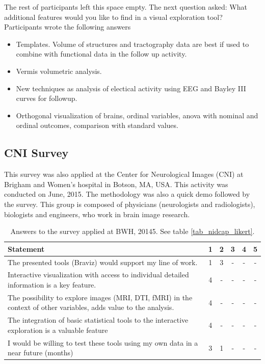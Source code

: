 The rest of participants left this space empty. The next question asked: What additional features would you like to find in a visual exploration tool? Participants wrote the following answers
\begin{itemize}
	\item Templates. Volume of structures and tractography data are best if used to combine with functional data in the follow up activity. 
	\item Vermis volumetric analysis.
	\item New techniques as analysis of electical activity using EEG and Bayley III curves for followup. 
	\item Orthogonal visualization of brains, ordinal variables, anova with nominal and ordinal outcomes, comparison with standard values.
\end{itemize}

\subsection{CNI Survey}

This survey was also applied at the Center for Neurological Images (CNI) at Brigham and Women's hospital in Botson, MA, USA. This activity was conducted on June, 2015. The methodology was also a quick demo followed by the survey. This group is composed of physicians (neurologists and radiologists), biologists and engineers, who work in brain image research. 

\begin{table}
	\centering
		\begin{tabular}{p{}ccccc}
			\toprule
			Statement&1&2&3&4&5 \\
			\midrule
			The presented tools (Braviz) would support my line of work. & 1 & 3 &-& - & - \\
			Interactive visualization with access to individual detailed information is a key feature. &4&-&-&-&- \\			
			The possibility to explore images (MRI, DTI, fMRI) in the context of other variables, adds value to the analysis. &4&-&-&-&- \\
			The integration of basic statistical tools to the interactive exploration is a valuable feature &4&-&-&-&- \\
			I would be willing to test these tools using my own data in a near future (months) & 3 & 1 & - &-&- \\
			\bottomrule
		\end{tabular}
	\caption{Answers to the survey applied at BWH, 20145. See table \ref{tab_nidcap_likert}.}
	\label{tab_bwh_likert}
\end{table}


